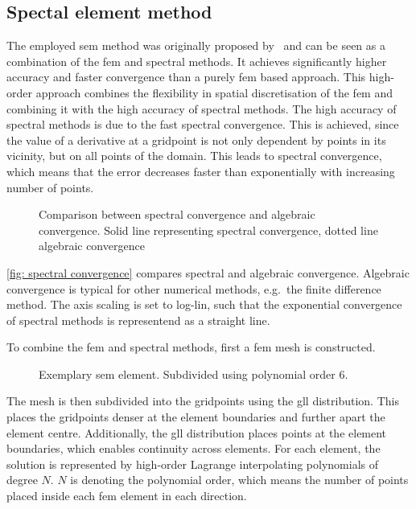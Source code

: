 \subsection{Spectal element method}
The employed \acrshort{sem} method was originally proposed by~\cite{pateraSpectralElementMethod1984} and can be seen as a combination of the \acrfull{fem} and spectral methods.
It achieves significantly higher accuracy and faster convergence than a purely \acrshort{fem} based approach. 
This high-order approach combines the flexibility in spatial discretisation of the \acrshort{fem} and combining it with the high accuracy of spectral methods.
The high accuracy of spectral methods is due to the fast spectral convergence.
This is achieved, since the  value of a derivative at a gridpoint is not only dependent by points in its vicinity, but on all points of the domain.
This leads to spectral convergence, which means that the error decreases faster than exponentially with increasing number of points.
\begin{figure}
    \centering
    
    \caption{Comparison between spectral convergence and algebraic convergence. Solid line representing spectral convergence, dotted line algebraic convergence}
    \label{fig: spectral convergence}
\end{figure}
\autoref{fig: spectral convergence} compares spectral and algebraic convergence. 
Algebraic convergence is typical for other numerical methods, e.g.\ the finite difference method.
The axis scaling is set to log-lin, such that the exponential convergence of spectral methods is representend as a straight line.

To combine the \acrshort{fem} and spectral methods, first a \acrshort{fem} mesh is constructed.
\begin{figure}
    \centering
    
    \caption{Exemplary \acrshort{sem} element. Subdivided using polynomial order 6.}
    \label{fig: SEM element}
\end{figure}
The mesh is then subdivided into the gridpoints using the \acrfull{gll} distribution.
This places the gridpoints denser at the element boundaries and further apart the element centre.
Additionally, the \acrshort{gll} distribution places points at the element boundaries, which enables continuity across elements.
For each element, the solution is represented by high-order Lagrange interpolating polynomials of degree $N$.
$N$ is denoting the polynomial order, which means the number of points placed inside each \acrshort{fem} element in each direction.

